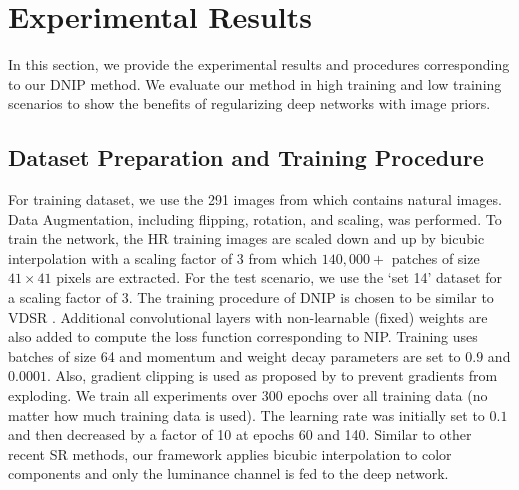 \documentclass[9pt]{article}
\begin{document}
%
%
%
%
%


\section{Experimental Results}
In this section, we provide the experimental results and procedures corresponding to our DNIP method. We evaluate our method in high training and low training scenarios to show the benefits of regularizing deep networks with image priors.

\subsection{Dataset Preparation and Training Procedure }
For training dataset, we use the 291 images from \cite{schulter2015fast} which contains natural images. Data Augmentation, including flipping, rotation, and scaling, was performed. To train the network, the HR training images are scaled down and up by bicubic interpolation with a scaling factor of $3$ from which $140,000+$ patches of size $41\times 41$ pixels are extracted. For the test scenario, we use the `set 14' \cite{Zeyde:SR_Springer2012} dataset for a scaling factor of $3$. The training procedure of DNIP is chosen to be similar to VDSR \cite{Kim_2016_VDSR}. Additional convolutional layers with non-learnable (fixed) weights are also added to compute the loss function corresponding to NIP. Training uses batches of size 64 and momentum and weight decay parameters are set to $0.9$ and $0.0001$. Also, gradient clipping is used as proposed by \cite{Kim_2016_VDSR} to prevent gradients from exploding. We train all experiments over 300 epochs over all training data (no matter how much training data is used). The learning rate was initially set to $0.1$ and then decreased by a factor of 10 at epochs 60 and 140. Similar to other recent SR methods, our framework applies bicubic interpolation to color components and only the luminance channel is fed to the deep network.
\end{document}

